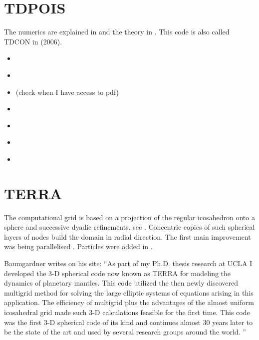 \section{TDPOIS} 

The numerics are explained in \cite{hous87} and the theory in \cite{hous90}.
This code is also called TDCON in \textcite{cosc06} (2006).

\begin{small}
\begin{itemize}
\item[\nineteeneightyseven]\textcite{hous87}
\item[\nineteenninety] \textcite{hous90} \textcite{hous90b}
\item[\nineteenninetyfive] \textcite{schh95} (check when I have access to pdf)
\item[\nineteenninetysix] \textcite{schh96}
\item[\twothousandtwo] \textcite{scbh02}
\item[\twothousandfour] \textcite{scbh04}
\item[\twothousandsix] \textcite{cosc06}
\end{itemize}
\end{small}

\section{TERRA} 
The computational grid is based on a projection of the regular icosahedron onto a 
sphere and successive dyadic refinements, see \textcite{bafr85}.  Concentric copies of such  
spherical layers of nodes build the domain in radial direction.
The first main improvement was being parallelised \textcite{buba95}.
Particles were added in \textcite{strb02}.

Baumgardner writes on his site:
``As part of my Ph.D. thesis research at UCLA I developed the 3-D spherical code now 
known as TERRA for modeling the dynamics of planetary mantles.  This code utilized 
the then newly discovered multigrid method for solving the large elliptic systems 
of equations arising in this application.  The efficiency of multigrid plus the advantages 
of the almost uniform icosahedral grid made such 3-D calculations feasible for the 
first time.  This code was the first 3-D spherical code of its kind and continues 
almost 30 years later to be the state of the art and used by several research groups around the world. ''

